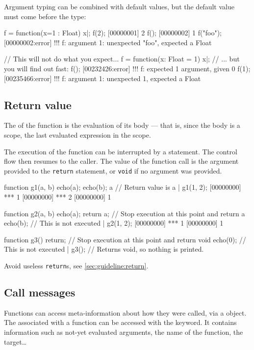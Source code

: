 Argument typing can be combined with default values, but the default value
must come before the type:

\begin{urbiscript}
f = function(x=1 : Float) {x}|;
f(2);
[00000001] 2
f();
[00000002] 1
f("foo");
[00000002:error] !!! f: argument 1: unexpected "foo", expected a Float

// This will not do what you expect...
f = function(x: Float = 1) {x}|;
// ... but you will find out fast:
f();
[00232426:error] !!! f: expected 1 argument, given 0
f(1);
[00235466:error] !!! f: argument 1: unexpected 1, expected a Float

\end{urbiscript}

\subsection{Return value}
\label{sec:lang:rv}
The  of the function is the
evaluation of its body --- that is, since the body is a scope, the last
evaluated expression in the scope.

The execution of the function can be interrupted by a 
statement.  The control flow then resumes to the caller.  The value of the
function call is the argument provided to the \lstinline{return} statement,
or \lstinline{void} if no argument was provided.

\begin{urbiscript}
function g1(a, b)
{
  echo(a);
  echo(b);
  a // Return value is a
}|
g1(1, 2);
[00000000] *** 1
[00000000] *** 2
[00000000] 1

function g2(a, b)
{
  echo(a);
  return a; // Stop execution at this point and return a
  echo(b); // This is not executed
}|
g2(1, 2);
[00000000] *** 1
[00000000] 1

function g3()
{
  return; // Stop execution at this point and return void
  echo(0); // This is not executed
}|
g3(); // Returns void, so nothing is printed.
\end{urbiscript}

Avoid useless \lstinline{return}s, see \autoref{sec:guideline:return}.

\subsection{Call messages}
\label{sec:lang:call}

Functions can access meta-information about how they were called, via a
 object. The  associated with a
function can be accessed with the  keyword.  It contains
information such as not-yet evaluated arguments, the name of the function,
the target\ldots

